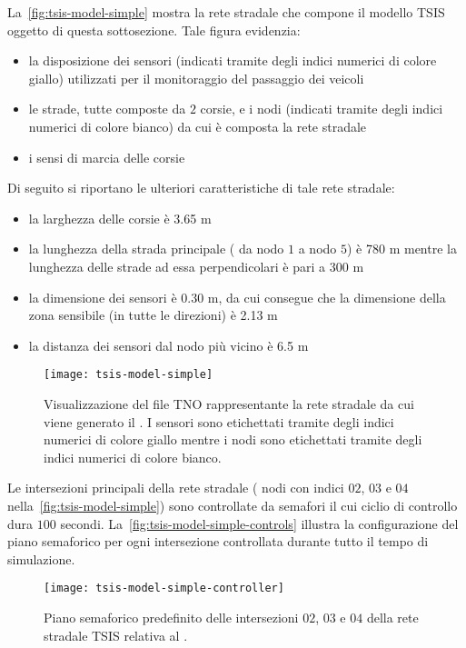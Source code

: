 La~\vref{fig:tsis-model-simple} mostra la rete stradale che compone il modello \acs{TSIS} oggetto di questa sottosezione. Tale figura evidenzia:
\begin{itemize}
	\item la disposizione dei sensori (indicati tramite degli indici numerici di colore giallo) utilizzati per il monitoraggio del passaggio dei veicoli
	\item le strade, tutte composte da $2$ corsie, e i nodi (indicati tramite degli indici numerici di colore bianco) da cui è composta la rete stradale
	\item i sensi di marcia delle corsie
\end{itemize}
Di seguito si riportano le ulteriori caratteristiche di tale rete stradale:
\begin{itemize}
	\item la larghezza delle corsie è \num{3.65} \si{\metre}
	\item la lunghezza della strada principale (\ie{} da nodo $1$ a nodo $5$) è \num{780} \si{\metre} mentre la lunghezza delle strade ad essa perpendicolari è pari a \num{300} \si{\metre}
	\item la dimensione dei sensori è \num{0.30} \si{\metre}, da cui consegue che la dimensione della zona sensibile (in tutte le direzioni) è \num{2.13} \si{\metre}
	\item la distanza dei sensori dal nodo più vicino è \num{6.5} \si{\metre}
\end{itemize}
\begin{figure}
  	\centering
  	\texttt{[image: tsis-model-simple]}%
  	\caption[Rete stradale relativa al ]{Visualizzazione del file \acs{TNO} rappresentante la rete stradale da cui viene generato il . I sensori sono etichettati tramite degli indici numerici di colore giallo mentre i nodi sono etichettati tramite degli indici numerici di colore bianco.}
	\label{fig:tsis-model-simple}
\end{figure}

Le intersezioni principali della rete stradale (\ie{} nodi con indici $02$, $03$ e $04$ nella~\vref{fig:tsis-model-simple}) sono controllate da semafori il cui ciclio di controllo dura $100$ secondi. La~\vref{fig:tsis-model-simple-controls} illustra la configurazione del piano semaforico per ogni intersezione controllata durante tutto il tempo di simulazione.
\begin{figure}[H]
	\centering
	\texttt{[image: tsis-model-simple-controller]}
	\caption[Piano semaforico relativo al ]{Piano semaforico predefinito delle intersezioni $02$, $03$ e $04$ della rete stradale \acs{TSIS} relativa al .}
	\label{fig:tsis-model-simple-controls}
\end{figure}

